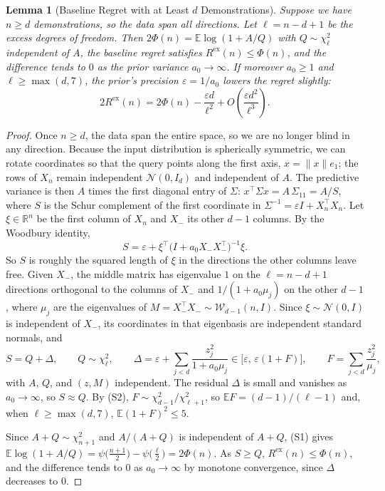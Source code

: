 \documentclass{article}
\newtheorem{lemma}{Lemma}[section]
\newcommand{\E}{\mathbb{E}}
\newcommand{\R}{\mathbb{R}}
\begin{document}
\begin{lemma}[Baseline Regret with at Least $d$ Demonstrations]\label{lem:many}
Suppose we have $n \ge d$ demonstrations, so the data span all directions. Let $\ell = n - d + 1$ be the excess degrees of freedom. Then $2\Phi(n) = \E \log(1 + A/Q)$ with $Q \sim \chi^2_\ell$ independent of $A$, the baseline regret satisfies $R^{\mathrm{ex}}(n) \le \Phi(n)$, and the difference tends to $0$ as the prior variance $a_0 \to \infty$. If moreover $a_0 \ge 1$ and $\ell \ge \max(d, 7)$, the prior's precision $\varepsilon = 1/a_0$ lowers the regret slightly:
\[
2R^{\mathrm{ex}}(n) = 2\Phi(n) - \frac{\varepsilon d}{\ell^2} + O\!\left(\frac{\varepsilon d^2}{\ell^3}\right).
\]
\end{lemma}

\begin{proof}
Once $n \ge d$, the data span the entire space, so we are no longer blind in any direction. Because the input distribution is spherically symmetric, we can rotate coordinates so that the query points along the first axis, $x = \|x\| e_1$; the rows of $X_n$ remain independent $\mathcal{N}(0, I_d)$ and independent of $A$. The predictive variance is then $A$ times the first diagonal entry of $\Sigma$: $x^\top \Sigma x = A\,\Sigma_{11} = A/S$, where $S$ is the Schur complement of the first coordinate in $\Sigma^{-1} = \varepsilon I + X_n^\top X_n$. Let $\xi \in \R^n$ be the first column of $X_n$ and $X_-$ its other $d-1$ columns. By the Woodbury identity,
\[
S = \varepsilon + \xi^\top \big(I + a_0 X_- X_-^\top\big)^{-1} \xi .
\]
So $S$ is roughly the squared length of $\xi$ in the directions the other columns leave free. Given $X_-$, the middle matrix has eigenvalue $1$ on the $\ell = n - d + 1$ directions orthogonal to the columns of $X_-$ and $1/(1 + a_0 \mu_j)$ on the other $d - 1$, where $\mu_j$ are the eigenvalues of $M = X_-^\top X_- \sim \mathcal{W}_{d-1}(n, I)$. Since $\xi \sim \mathcal{N}(0, I)$ is independent of $X_-$, its coordinates in that eigenbasis are independent standard normals, and
\[
S = Q + \Delta, \qquad Q \sim \chi^2_\ell, \qquad
\Delta = \varepsilon + \sum_{j < d} \frac{z_j^2}{1 + a_0 \mu_j} \in \big[\varepsilon,\, \varepsilon(1 + F)\big], \qquad F = \sum_{j < d} \frac{z_j^2}{\mu_j},
\]
with $A$, $Q$, and $(z, M)$ independent. The residual $\Delta$ is small and vanishes as $a_0 \to \infty$, so $S \approx Q$. By (S2), $F \sim \chi^2_{d-1} / \chi^2_{\ell+1}$, so $\E F = (d-1)/(\ell-1)$ and, when $\ell \ge \max(d, 7)$, $\E (1+F)^2 \le 5$.

Since $A + Q \sim \chi^2_{n+1}$ and $A/(A+Q)$ is independent of $A+Q$, (S1) gives $\E \log(1 + A/Q) = \psi\big(\tfrac{n+1}{2}\big) - \psi\big(\tfrac{\ell}{2}\big) = 2\Phi(n)$. As $S \ge Q$, $R^{\mathrm{ex}}(n) \le \Phi(n)$, and the difference tends to $0$ as $a_0 \to \infty$ by monotone convergence, since $\Delta$ decreases to $0$.


\end{proof}
\end{document}
